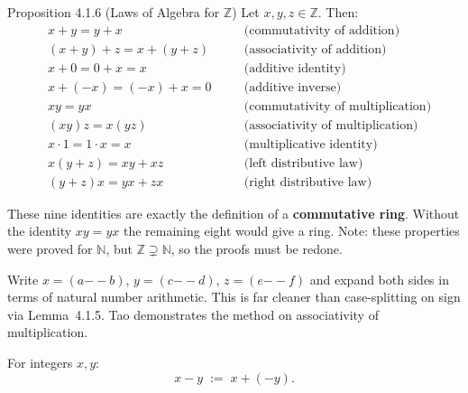 \begin{propositionbox}{Proposition 4.1.6 (Laws of Algebra for $\mathbb{Z}$)}
Let $x, y, z \in \mathbb{Z}$. Then:
\begin{align*}
&x + y = y + x &\quad& \text{(commutativity of addition)}\\
&(x+y)+z = x+(y+z) &\quad& \text{(associativity of addition)}\\
&x + 0 = 0 + x = x &\quad& \text{(additive identity)}\\
&x + (-x) = (-x) + x = 0 &\quad& \text{(additive inverse)}\\
&xy = yx &\quad& \text{(commutativity of multiplication)}\\
&(xy)z = x(yz) &\quad& \text{(associativity of multiplication)}\\
&x \cdot 1 = 1 \cdot x = x &\quad& \text{(multiplicative identity)}\\
&x(y+z) = xy + xz &\quad& \text{(left distributive law)}\\
&(y+z)x = yx + zx &\quad& \text{(right distributive law)}
\end{align*}
\end{propositionbox}

\begin{remark*}
These nine identities are exactly the definition of a
\textbf{commutative ring}.
Without the identity $xy = yx$ the remaining eight would give a ring.
Note: these properties were proved for $\mathbb{N}$, but
$\mathbb{Z} \supsetneq \mathbb{N}$, so the proofs must be redone.
\end{remark*}

\begin{remark*}
Write $x = (a {-\!\!-} b)$, $y = (c {-\!\!-} d)$, $z = (e {-\!\!-} f)$
and expand both sides in terms of natural number arithmetic.
This is far cleaner than case-splitting on sign via Lemma~4.1.5.
Tao demonstrates the method on associativity of multiplication.
\end{remark*}

\begin{definition}[Subtraction]
\label{def:int-subtraction}
For integers $x, y$:
\[
x - y \;:=\; x + (-y).
\]
\end{definition}

